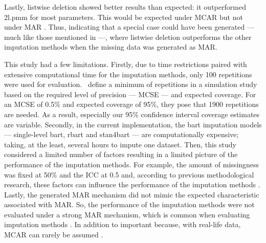 \documentclass[3p,12pt,a4paper]{elsarticle}
\begin{document}
Lastly, listwise deletion showed better results than expected: it outperformed 2l.pmm for most parameters. This would be expected under MCAR but not under MAR \citep{buurenFlexibleImputationMissing2018,enders2018a,peeters2015,austin2021,carpenter2013,little2002,grund2018,ludtke2017,grund2021,schouten2021}. Thus, indicating that a special case could have been generated --- much like those mentioned in \citep[§2.7]{buurenFlexibleImputationMissing2018} ---, where listwise deletion outperforms the other imputation methods when the missing data was generated as MAR.

This study had a few limitations. Firstly, due to time restrictions paired with extensive computational time for the imputation methods, only 100 repetitions were used for evaluation.~\citet{morris2019} define a minimum of repetitions in a simulation study based on the required level of precision --- MCSE --- and expected coverage. For an MCSE of 0.5\% and expected coverage of 95\%, they pose that 1900 repetitions are needed. As a result, especially our 95\% confidence interval coverage estimates are variable. Secondly, in the current implementation, the bart imputation models --- single-level bart, rbart and stan4bart --- are computationally expensive; taking, at the least, several hours to impute one dataset. Then, this study considered a limited number of factors resulting in a limited picture of the performance of the imputation methods. For example, the amount of missingness was fixed at 50\% and the ICC at 0.5 and, according to previous methodological research, these factors can influence the performance of the imputation methods \citep{enders2018,enders2018a,enders2020,mistler2017,akkayahocagil2023,grund2016,grund2018a,grund2018,ludtke2017,grund2021}. Lastly, the generated MAR mechanism did not mimic the expected characteristic associated with MAR. So, the performance of the imputation methods were not evaluated under a strong MAR mechanism, which is common when evaluating imputation methods \citep{buurenFlexibleImputationMissing2018,enders2018a,peeters2015,austin2021,carpenter2013,little2002,grund2018,ludtke2017,grund2021,schouten2021}. In addition to important because, with real-life data, MCAR can rarely be assumed \citep{oberman2023,buurenFlexibleImputationMissing2018,kang2013,little2002}.
\end{document}
